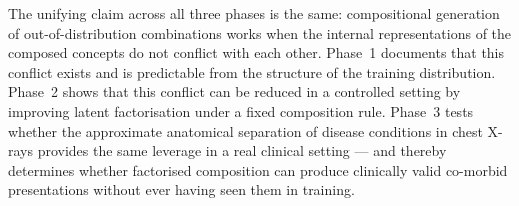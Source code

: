 The unifying claim across all three phases is the same: compositional generation of
out-of-distribution combinations works when the internal representations of the composed concepts
do not conflict with each other. Phase~1 documents that this conflict exists and is predictable
from the structure of the training distribution. Phase~2 shows that this conflict can be reduced
in a controlled setting by improving latent factorisation under a fixed composition rule. Phase~3
tests whether the approximate anatomical separation of disease conditions in chest X-rays provides
the same leverage in a real clinical setting --- and thereby determines whether factorised
composition can produce clinically valid co-morbid presentations without ever having seen them in
training.

